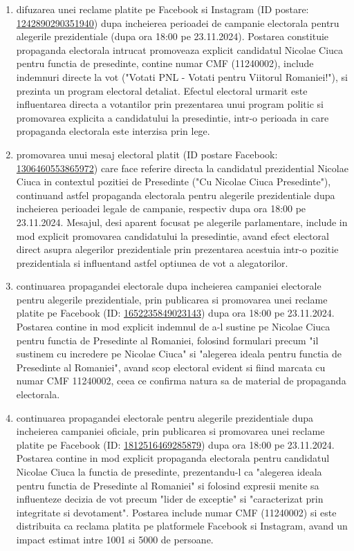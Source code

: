 \documentclass[a4paper,12pt]{article}
\begin{document}
\begin{enumerate}[leftmargin=*, label=\arabic*.)]
    \item difuzarea unei reclame platite pe Facebook si Instagram (ID postare: \href{https://www.facebook.com/ads/library/?id=1242890290351940}{1242890290351940}) dupa incheierea perioadei de campanie electorala pentru alegerile prezidentiale (dupa ora 18:00 pe 23.11.2024). Postarea constituie propaganda electorala intrucat promoveaza explicit candidatul Nicolae Ciuca pentru functia de presedinte, contine numar CMF (11240002), include indemnuri directe la vot ("Votati PNL - Votati pentru Viitorul Romaniei!"), si prezinta un program electoral detaliat. Efectul electoral urmarit este influentarea directa a votantilor prin prezentarea unui program politic si promovarea explicita a candidatului la presedintie, intr-o perioada in care propaganda electorala este interzisa prin lege.
    \item promovarea unui mesaj electoral platit (ID postare Facebook: \href{https://www.facebook.com/ads/library/?id=1306460553865972}{1306460553865972}) care face referire directa la candidatul prezidential Nicolae Ciuca in contextul pozitiei de Presedinte ("Cu Nicolae Ciuca Presedinte"), continuand astfel propaganda electorala pentru alegerile prezidentiale dupa incheierea perioadei legale de campanie, respectiv dupa ora 18:00 pe 23.11.2024. Mesajul, desi aparent focusat pe alegerile parlamentare, include in mod explicit promovarea candidatului la presedintie, avand efect electoral direct asupra alegerilor prezidentiale prin prezentarea acestuia intr-o pozitie prezidentiala si influentand astfel optiunea de vot a alegatorilor.
    \item continuarea propagandei electorale dupa incheierea campaniei electorale pentru alegerile prezidentiale, prin publicarea si promovarea unei reclame platite pe Facebook (ID: \href{https://www.facebook.com/ads/library/?id=1652235849023143}{1652235849023143}) dupa ora 18:00 pe 23.11.2024. Postarea contine in mod explicit indemnul de a-l sustine pe Nicolae Ciuca pentru functia de Presedinte al Romaniei, folosind formulari precum "il sustinem cu incredere pe Nicolae Ciuca" si "alegerea ideala pentru functia de Presedinte al Romaniei", avand scop electoral evident si fiind marcata cu numar CMF 11240002, ceea ce confirma natura sa de material de propaganda electorala.
    \item continuarea propagandei electorale pentru alegerile prezidentiale dupa incheierea campaniei oficiale, prin publicarea si promovarea unei reclame platite pe Facebook (ID: \href{https://www.facebook.com/ads/library/?id=1812516469285879}{1812516469285879}) dupa ora 18:00 pe 23.11.2024. Postarea contine in mod explicit propaganda electorala pentru candidatul Nicolae Ciuca la functia de presedinte, prezentandu-l ca "alegerea ideala pentru functia de Presedinte al Romaniei" si folosind expresii menite sa influenteze decizia de vot precum "lider de exceptie" si "caracterizat prin integritate si devotament". Postarea include numar CMF (11240002) si este distribuita ca reclama platita pe platformele Facebook si Instagram, avand un impact estimat intre 1001 si 5000 de persoane.

\end{enumerate}
\end{document}
